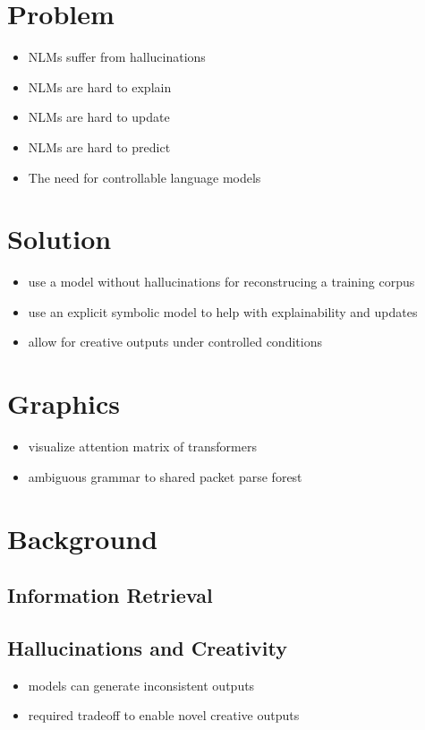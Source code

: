\section{Problem}
\begin{itemize}
    \item NLMs suffer from hallucinations
    \item NLMs are hard to explain
    \item NLMs are hard to update
    \item NLMs are hard to predict
    \item The need for controllable language models
\end{itemize}

\section{Solution}
\begin{itemize}
    \item use a model without hallucinations for reconstrucing a training corpus
    \item use an explicit symbolic model to help with explainability and updates
    \item allow for creative outputs under controlled conditions
\end{itemize}

\section{Graphics}
\begin{itemize}
    \item visualize attention matrix of transformers
    \item ambiguous grammar to shared packet parse forest
\end{itemize}

\section{Background}

\subsection{Information Retrieval}

\subsection{Hallucinations and Creativity}
\begin{itemize}
    \item models can generate inconsistent outputs
    \item required tradeoff to enable novel creative outputs
\end{itemize}


